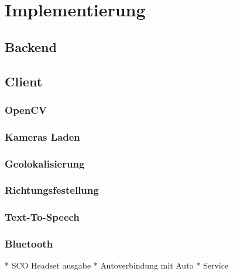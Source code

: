 \chapter{Implementierung}
\section{Backend}

\section{Client}
\subsection{OpenCV}
\subsection{Kameras Laden}
\subsection{Geolokalisierung}
\subsection{Richtungsfestellung}
\subsection{Text-To-Speech}
\subsection{Bluetooth}
* SCO Headset ausgabe
* Autoverbindung mit Auto
* Service 